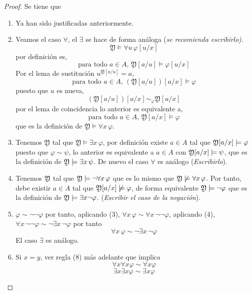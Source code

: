 \begin{proof} 
Se tiene que
\begin{enumerate}
	\item Ya han sido justificadas anteriormente.
	\item Veamos el caso $\forall$, el $\exists$ se hace de forma análoga (\textit{se recomienda escribirlo)}.
\[ \mathfrak{Y} \models \forall u \, \varphi[u/x] \]    
   por definición es, 
   \[ \mbox{para todo } a \in A, \, \mathfrak{Y}[a/u] \models \varphi[u/x] \] 
   Por el lema de sustitución $u^{\mathfrak{Y}[a/u]} = a$, 
\[ \mbox{para todo } a \in A, \, (\mathfrak{Y}[a/u])[a/x] \models \varphi \]   
    puesto que $u$ es nueva, 
\[ (\mathfrak{Y}[a/u])[a/x] \sim_{\varphi} \mathfrak{Y}[a/x] \]    
    por el lema de coincidencia lo anterior es equivalente a, 
\[ \mbox{para todo } a \in A, \, \mathfrak{Y}[a/x] \models \varphi \]    
     que es la definición de $\mathfrak{Y} \models \forall x \, \varphi$.
     
     \item Tenemos $\mathfrak{Y}$  tal que $\mathfrak{Y} \models \exists x \, \varphi$, por definición existe $a \in A$ tal que $\mathfrak{Y}[a/x] \models \varphi$ puesto que $\varphi \sim \psi$, lo anterior es equivalente a $a \in A$ con $\mathfrak{Y}[a/x] \models \psi$, que es la definición de $\mathfrak{Y} \models \exists x \, \psi$. De nuevo el caso $\forall$ es análogo (\textit{Escribirlo}).
     
    \item Tenemos $\mathfrak{Y}$ tal que $\mathfrak{Y} \models \neg \forall x \, \varphi$ que es lo mismo que $\mathfrak{Y} \not \models \forall x \, \varphi$. Por tanto, debe existir $a \in A$ tal que $\mathfrak{Y}[a/x] \not \models \varphi$, de forma equivalente $\mathfrak{Y} \models \neg \varphi$ que es la definición de $\mathfrak{Y} \models \exists x \neg \varphi$. (\textit{Escribir el caso de la negación}).
    
    \item $\varphi \sim \neg \neg \varphi$ por tanto, aplicando (3), $\forall x \, \varphi \sim \forall x \, \neg \neg \varphi$, aplicando (4), $\forall x \, \neg \neg \varphi \sim \neg \exists x \, \neg \varphi$ por tanto 
    \[ \forall x \, \varphi \sim \neg \exists x \, \neg \varphi \] 
    El caso $\exists$ es análogo.
    
    \item Si $x = y$, ver regla (8) más adelante que implica 
    \[ \forall x \forall x \varphi \sim \forall x \varphi \]
    \[ \exists x \exists x \varphi \sim \exists x \varphi \]
    

\end{enumerate}
\end{proof}

